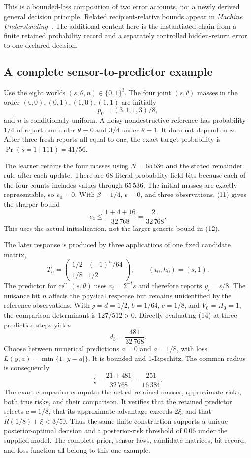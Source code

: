 \documentclass[11pt,letterpaper]{article}
\theoremstyle{plain}
\theoremstyle{definition}
\begin{document}
This is a bounded-loss composition of two error accounts, not a newly derived general decision principle. Related recipient-relative bounds appear in \emph{Machine Understanding}~\cite{understanding}. The additional content here is the instantiated chain from a finite retained probability record and a separately controlled hidden-return error to one declared decision.

\subsection{A complete sensor-to-predictor example}
Use the eight worlds $(s,\theta,n)\in\{0,1\}^3$. The four joint $(s,\theta)$ masses in the order $(0,0),(0,1),(1,0),(1,1)$ are initially
\[
 p_0=(3,1,1,3)/8,
\]
and $n$ is conditionally uniform. A noisy nondestructive reference has probability $1/4$ of report one under $\theta=0$ and $3/4$ under $\theta=1$. It does not depend on $n$. After three fresh reports all equal to one, the exact target probability is $\Pr(s=1\mid111)=41/56$.

The learner retains the four masses using $N=65\,536$ and the stated remainder rule after each update. There are 68 literal probability-field bits because each of the four counts includes values through $65\,536$. The initial masses are exactly representable, so $e_0=0$. With $\beta=1/4$, $\varepsilon=0$, and three observations, (11) gives the sharper bound
\[
 e_3\le\frac{1+4+16}{32\,768}=\frac{21}{32\,768}.
\]
This uses the actual initialization, not the larger generic bound in (12).

The later response is produced by three applications of one fixed candidate matrix,
\[
 T_n=\begin{pmatrix}1/2&(-1)^n/64\\1/8&1/2\end{pmatrix},
 \qquad (v_0,h_0)=(s,1).
\tag{17}
\]
The predictor for cell $(s,\theta)$ uses $\bar v_t=2^{-t}s$ and therefore reports $\bar y_i=s/8$. The nuisance bit $n$ affects the physical response but remains unidentified by the reference observations. With $g=d=1/2$, $b=1/64$, $c=1/8$, and $V_0=H_0=1$, the comparison determinant is $127/512>0$. Directly evaluating (14) at three prediction steps yields
\[
 d_3=\frac{481}{32\,768}.
\]
Choose between numerical predictions $a=0$ and $a=1/8$, with loss $L(y,a)=\min\{1,|y-a|\}$. It is bounded and 1-Lipschitz. The common radius is consequently
\[
 \xi=\frac{21+481}{32\,768}=\frac{251}{16\,384}.
\]
The exact companion computes the actual retained masses, approximate risks, both true risks, and their comparison. It verifies that the retained predictor selects $a=1/8$, that its approximate advantage exceeds $2\xi$, and that $\widehat R(1/8)+\xi<3/50$. Thus the same finite construction supports a unique posterior-optimal decision and a posterior-risk threshold of $0.06$ under the supplied model. The complete prior, sensor laws, candidate matrices, bit record, and loss function all belong to this one example.
\end{document}
